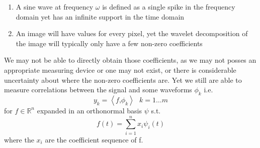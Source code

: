 \begin{enumerate}
\item  A sine wave at frequency \(\omega\) is defined as a single spike in the frequency domain yet has an infinite support in the time domain
\item An image will have values for every pixel, yet the wavelet decomposition of the image will typically only have a few non-zero coefficients
\end{enumerate} 

We may not be able to directly obtain those coefficients, as we may not posses an appropriate measuring device or one may not exist, or there is considerable uncertainty about where the non-zero coefficients are. Yet we still are able to measure correlations between the signal and some waveforms \(\phi_{k}\) i.e. 
%
\begin{equation}
y_{k} = \left\langle f \text{,} \phi_{k} \right\rangle \text{ } k = 1 \ldots m
\end{equation}
%
for \( f \in \mathbb{R}^n \) expanded in an orthonormal basis \( \psi \) s.t.
%
\begin{equation}
f(t) = \sum_{i = 1}^n x_{i}\psi_{i}(t) 
\end{equation}
%
where the \(x_{i} \) are the coefficient sequence of f. 





